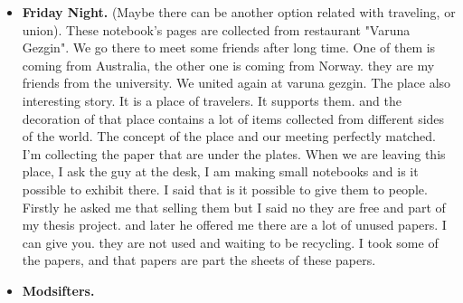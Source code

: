 \begin{itemize}
\item \textbf{Friday Night.} (Maybe there can be another option related with traveling, or union). These notebook's pages are collected from restaurant "Varuna Gezgin". We go there to meet some friends after long time. One of them is coming from Australia, the other one is coming from Norway. they are my friends from the university. We united again at varuna gezgin. The place also interesting story. It is a place of travelers. It supports them. and the decoration of that place contains a lot of items collected from different sides of the world. The concept of the place and our meeting perfectly matched. I'm collecting the paper that are under the plates. When we are leaving this place, I ask the guy at the desk, I am making small notebooks and is it possible to exhibit there. I said that is it possible to give them to people. Firstly he asked me that selling them but I said no they are free and part of my thesis project. and later he offered me there are a lot of unused papers. I can give you. they are not used and waiting to be recycling. I took some of the papers, and that papers are part the sheets of these papers. 
\item \textbf{Modsifters.} 



\end{itemize}

